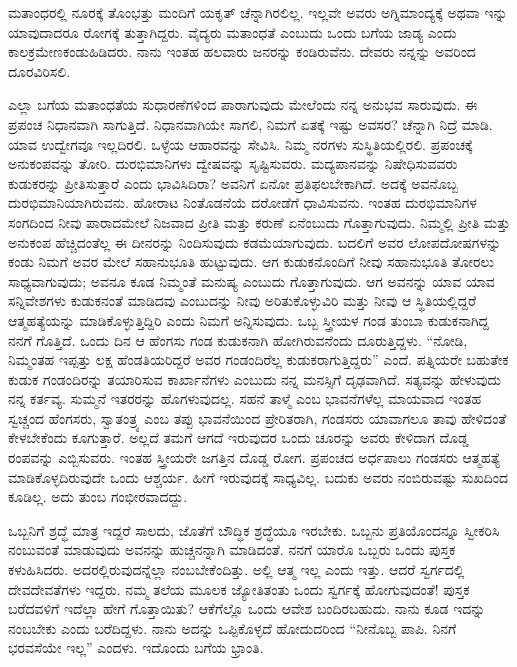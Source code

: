 ಮತಾಂಧರಲ್ಲಿ ನೂರಕ್ಕೆ ತೊಂಭತ್ತು ಮಂದಿಗೆ ಯಕೃತ್​ ಚೆನ್ನಾಗಿರಲಿಲ್ಲ. ಇಲ್ಲವೇ ಅವರು ಅಗ್ನಿಮಾಂದ್ಯಕ್ಕೆ ಅಥವಾ ಇನ್ನು ಯಾವುದಾದರೂ ರೋಗಕ್ಕೆ ತುತ್ತಾಗಿದ್ದರು. ವೈದ್ಯರು ಮತಾಂಧತೆ ಎಂಬುದು ಒಂದು ಬಗೆಯ ಜಾಡ್ಯ ಎಂದು ಕಾಲಕ್ರಮೇಣ\break ಕಂಡುಹಿಡಿದರು. ನಾನು ಇಂತಹ ಹಲವಾರು ಜನರನ್ನು ಕಂಡಿರುವೆನು. ದೇವರು ನನ್ನನ್ನು ಅವರಿಂದ ದೂರವಿರಿಸಲಿ.

ಎಲ್ಲಾ ಬಗೆಯ ಮತಾಂಧತೆಯ ಸುಧಾರಣೆಗಳಿಂದ ಪಾರಾಗುವುದು ಮೇಲೆಂದು ನನ್ನ ಅನುಭವ ಸಾರುವುದು. ಈ ಪ್ರಪಂಚ ನಿಧಾನವಾಗಿ ಸಾಗುತ್ತಿದೆ. ನಿಧಾನವಾಗಿಯೇ ಸಾಗಲಿ, ನಿಮಗೆ ಏತಕ್ಕೆ ಇಷ್ಟು ಅವಸರ? ಚೆನ್ನಾಗಿ ನಿದ್ರೆ ಮಾಡಿ. ಯಾವ ಉದ್ವೇಗವೂ ಇಲ್ಲದಿರಲಿ. ಒಳ್ಳೆಯ ಆಹಾರವನ್ನು ಸೇವಿಸಿ. ನಿಮ್ಮ ನರಗಳು ಸುಸ್ಥಿತಿಯಲ್ಲಿರಲಿ. ಪ್ರಪಂಚಕ್ಕೆ ಅನುಕಂಪವನ್ನು ತೋರಿ. ದುರಭಿಮಾನಿಗಳು ದ್ವೇಷವನ್ನು ಸೃಷ್ಟಿಸುವರು. ಮದ್ಯಪಾನವನ್ನು ನಿಷೇಧಿಸುವವರು ಕುಡುಕರನ್ನು ಪ್ರೀತಿಸುತ್ತಾರೆ ಎಂದು ಭಾವಿಸಿದಿರಾ? ಅವನಿಗೆ ಏನೋ ಪ್ರತಿಫಲಬೇಕಾಗಿದೆ. ಅದಕ್ಕೆ ಅವನೊಬ್ಬ ದುರಭಿಮಾನಿಯಾಗಿರುವನು. ಹೋರಾಟ ನಿಂತೊಡನೆಯೆ ದರೋಡೆಗೆ ಧಾವಿಸುವನು. ಇಂತಹ ದುರಭಿಮಾನಿಗಳ ಸಂಗದಿಂದ ನೀವು ಪಾರಾದಮೇಲೆ ನಿಜವಾದ ಪ್ರೀತಿ ಮತ್ತು ಕರುಣೆ ಏನೆಂಬುದು ಗೊತ್ತಾಗುವುದು. ನಿಮ್ಮಲ್ಲಿ ಪ್ರೀತಿ ಮತ್ತು ಅನುಕಂಪ ಹೆಚ್ಚಿದಂತೆಲ್ಲ ಈ ದೀನರನ್ನು ನಿಂದಿಸುವುದು ಕಡಮೆಯಾಗುವುದು. ಬದಲಿಗೆ ಅವರ ಲೋಪದೋಷಗಳನ್ನು ಕಂಡು ನಿಮಗೆ ಅವರ ಮೇಲೆ ಸಹಾನುಭೂತಿ ಹುಟ್ಟುವುದು. ಆಗ ಕುಡುಕನೊಂದಿಗೆ ನೀವು ಸಹಾನುಭೂತಿ ತೋರಲು ಸಾಧ್ಯವಾಗುವುದು; ಅವನೂ ಕೂಡ ನಿಮ್ಮಂತೆ ಮನುಷ್ಯ ಎಂಬುದು ಗೊತ್ತಾಗುವುದು. ಆಗ ಅವನನ್ನು ಯಾವ ಯಾವ ಸನ್ನಿವೇಶಗಳು ಕುಡುಕನಂತೆ ಮಾಡಿದವು ಎಂಬುದನ್ನು ನೀವು ಅರಿತುಕೊಳ್ಳುವಿರಿ ಮತ್ತು ನೀವು ಆ ಸ್ಥಿತಿಯಲ್ಲಿದ್ದರೆ ಆತ್ಮಹತ್ಯೆಯನ್ನು ಮಾಡಿಕೊಳ್ಳುತ್ತಿದ್ದಿರಿ ಎಂದು ನಿಮಗೆ ಅನ್ನಿಸುವುದು. ಒಬ್ಬ ಸ್ತ್ರೀಯಳ ಗಂಡ ತುಂಬಾ ಕುಡುಕನಾಗಿದ್ದ ನನಗೆ ಗೊತ್ತಿದೆ. ಒಂದು ದಿನ ಆ ಹೆಂಗಸು ಗಂಡ ಕುಡುಕನಾಗಿ ಹೋಗಿರುವನೆಂದು ದೂರುತ್ತಿದ್ದಳು. “ನೋಡಿ, ನಿಮ್ಮಂತಹ ಇಪ್ಪತ್ತು ಲಕ್ಷ ಹೆಂಡತಿಯರಿದ್ದರೆ ಅವರ ಗಂಡಂದಿರೆಲ್ಲ ಕುಡುಕರಾಗುತ್ತಿದ್ದರು” ಎಂದೆ. ಪತ್ನಿಯರೇ ಬಹುತೇಕ ಕುಡುಕ ಗಂಡಂದಿರನ್ನು ತಯಾರಿಸುವ ಕಾರ್ಖಾನೆಗಳು ಎಂಬುದು ನನ್ನ ಮನಸ್ಸಿಗೆ ದೃಢವಾಗಿದೆ. ಸತ್ಯವನ್ನು ಹೇಳುವುದು ನನ್ನ ಕರ್ತವ್ಯ. ಸುಮ್ಮನೆ ಇತರರನ್ನು ಹೊಗಳುವುದಲ್ಲ. ಸಹನೆ ತಾಳ್ಮೆ ಎಂಬ ಭಾವನೆಗಳೆಲ್ಲ ಮಾಯವಾದ ಇಂತಹ ಸ್ವಚ್ಚಂದ ಹೆಂಗಸರು, ಸ್ವಾತಂತ್ರ್ಯ ಎಂಬ ತಪ್ಪು ಭಾವನೆಯಿಂದ ಪ್ರೇರಿತರಾಗಿ, ಗಂಡಸರು ಯಾವಾಗಲೂ ತಾವು ಹೇಳಿದಂತೆ ಕೇಳಬೇಕೆಂದು ಕೂಗುತ್ತಾರೆ. ಅಲ್ಲದೆ ತಮಗೆ ಆಗದೆ ಇರುವುದರ ಒಂದು ಚೂರನ್ನು ಅವರು ಕೇಳಿದಾಗ ದೊಡ್ಡ ರಂಪವನ್ನು ಎಬ್ಬಿಸುವರು. ಇಂತಹ ಸ್ತ್ರೀಯರೇ ಜಗತ್ತಿನ ದೊಡ್ಡ ರೋಗ. ಪ್ರಪಂಚದ ಅರ್ಧಪಾಲು ಗಂಡಸರು ಆತ್ಮಹತ್ಯೆ ಮಾಡಿಕೊಳ್ಳದಿರುವುದೇ ಒಂದು ಆಶ್ಚರ್ಯ. ಹೀಗೆ ಇರುವುದಕ್ಕೆ ಸಾಧ್ಯವಿಲ್ಲ. ಬದುಕು ಅವರು ನಂಬಿರುವಷ್ಟು ಸುಖದಿಂದ ಕೂಡಿಲ್ಲ. ಅದು ತುಂಬ ಗಂಭೀರವಾದದ್ದು.

ಒಬ್ಬನಿಗೆ ಶ್ರದ್ಧೆ ಮಾತ್ರ ಇದ್ದರೆ ಸಾಲದು, ಜೊತೆಗೆ ಬೌದ್ಧಿಕ ಶ್ರದ್ಧೆಯೂ ಇರಬೇಕು. ಒಬ್ಬನು ಪ್ರತಿಯೊಂದನ್ನೂ ಸ್ವೀಕರಿಸಿ ನಂಬುವಂತೆ ಮಾಡುವುದು ಅವನನ್ನು ಹುಚ್ಚನನ್ನಾಗಿ ಮಾಡಿದಂತೆ. ನನಗೆ ಯಾರೊ ಒಬ್ಬರು ಒಂದು ಪುಸ್ತಕ ಕಳುಹಿಸಿದರು. ಅದರಲ್ಲಿರುವುದ\-ನ್ನೆಲ್ಲಾ ನಂಬಬೇಕೆಂದಿತ್ತು. ಅಲ್ಲಿ ಆತ್ಮ ಇಲ್ಲ ಎಂದು ಇತ್ತು. ಆದರೆ ಸ್ವರ್ಗದಲ್ಲಿ ದೇವದೇವತೆಗಳು ಇದ್ದರು. ನಮ್ಮ ತಲೆಯ ಮೂಲಕ ಜ್ಯೋತಿತಂತು ಒಂದು ಸ್ವರ್ಗಕ್ಕೆ ಹೋಗುವುದಂತೆ! ಪುಸ್ತಕ ಬರೆದವಳಿಗೆ ಇದೆಲ್ಲಾ ಹೇಗೆ ಗೊತ್ತಾಯಿತು? ಆಕೆಗೆಲ್ಲೊ ಒಂದು ಆವೇಶ ಬಂದಿರಬಹುದು. ನಾನು ಕೂಡ ಇದನ್ನು ನಂಬಬೇಕು ಎಂದು ಬರೆದಿದ್ದಳು. ನಾನು ಅದನ್ನು ಒಪ್ಪಿಕೊಳ್ಳದೆ ಹೋದುದರಿಂದ “ನೀನೊಬ್ಬ ಪಾಪಿ. ನಿನಗೆ ಭರವಸೆಯೇ ಇಲ್ಲ” ಎಂದಳು. ಇದೊಂದು ಬಗೆಯ ಭ್ರಾಂತಿ.

